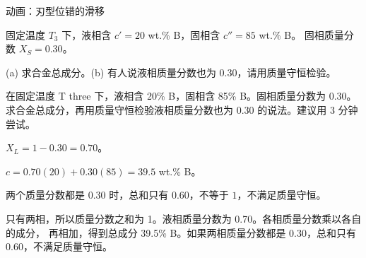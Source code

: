 \documentclass[aspectratio=169,11pt]{beamer}
\newcommand{\lattice}[1]{%
  \foreach \r in {0,...,7}{\foreach \c in {0,...,15}{
    \pgfmathsetmacro\xx{\c + (\r>3 ? 1/(1+exp(max(-9,min(9,-(#1-\c)*0.9)))) : 0)}
    \pgfmathsetmacro\yy{\r + (\r>3 ? 0.12 : -0.12)*exp(-((\xx-#1)^2)/3)}
    \node[atom,minimum size=7pt] at (\xx,\yy) {};}}
  \draw[accent,dashed] (-0.6,3.5)--(16.6,3.5);
  \node[note,anchor=west] at (16.7,3.5) {滑移面};
  \ifdim#1pt<15.8pt\ifdim#1pt>-0.8pt\node[accent,font=\bfseries\Large] at (#1,3.62) {$\perp$};\fi\fi}
\begin{document}
\begin{frame}{动画：刃型位错的滑移}
\centering
{}
\end{frame}

  {固定温度 $T_3$ 下，液相含 $c'=20$ wt.\% B，固相含 $c''=85$ wt.\% B。
   固相质量分数 $X_S=0.30$。\par\smallskip
   (a) 求合金总成分。(b) 有人说液相质量分数也为 0.30，请用质量守恒检验。}
  {在固定温度 T three 下，液相含 20\% B，固相含 85\% B。固相质量分数为 0.30。
   求合金总成分，再用质量守恒检验液相质量分数也为 0.30 的说法。建议用 3 分钟尝试。}
  {$X_L=1-0.30=0.70$。\par\medskip
   $c=0.70(20)+0.30(85)=39.5$ wt.\% B。\par\medskip
   两个质量分数都是 $0.30$ 时，总和只有 $0.60$，不等于 $1$，不满足质量守恒。}
  {只有两相，所以质量分数之和为 1。液相质量分数为 0.70。各相质量分数乘以各自的成分，
   再相加，得到总成分 39.5\% B。如果两相质量分数都是 0.30，总和只有 0.60，不满足质量守恒。}

\end{document}
